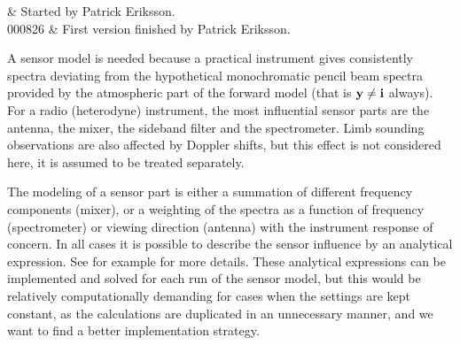 %
%
 \label{sec:sensor}


%
%
 & Started by Patrick Eriksson.\\
  000826 & First version finished by Patrick Eriksson.\\
\stophistory


%
%
%



%
%
A sensor model is needed because a practical instrument gives consistently
spectra deviating from the hypothetical monochromatic pencil
beam spectra provided by the atmospheric part of the forward model
(that is $\mathbf{y}\neq\mathbf{i}$ always). For a radio (heterodyne) instrument, the
most influential sensor parts are the antenna, the mixer, the sideband
filter and the spectrometer. Limb sounding observations are also
affected by Doppler shifts, but this effect is not considered here, it
is assumed to be treated separately.




 \label{sec:sensor:strategy}
 
 The modeling of a sensor part is either a summation of different
 frequency components (mixer), or a weighting of the spectra as a
 function of frequency (spectrometer) or viewing direction (antenna)
 with the instrument response of concern. In all cases it is
 possible to describe the sensor influence by an analytical
 expression. See for example \citet{eriksson:97a} for more details.
 These analytical expressions can be implemented and solved for each
 run of the sensor model, but this would be relatively computationally
 demanding for cases when the settings are kept constant, as the
 calculations are duplicated in an unnecessary manner, and we want to
 find a better implementation strategy.
 

